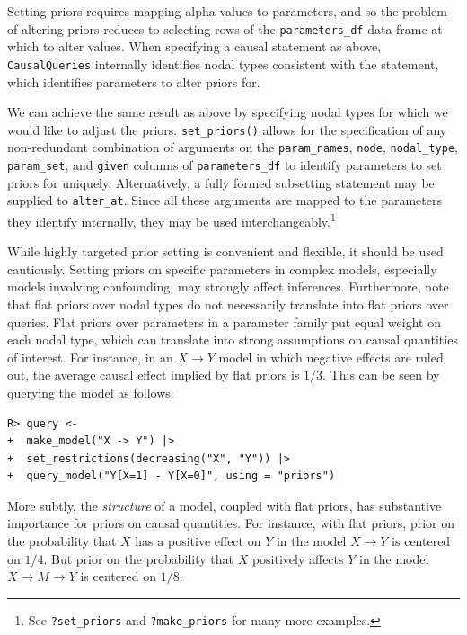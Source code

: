 \documentclass[
  11pt,
  article]{jss}
\begin{document}
Setting priors requires mapping alpha values to parameters, and so the
problem of altering priors reduces to selecting rows of the
\texttt{parameters\_df} data frame at which to alter values. When
specifying a causal statement as above, \texttt{CausalQueries}
internally identifies nodal types consistent with the statement, which
identifies parameters to alter priors for.

We can achieve the same result as above by specifying nodal types for
which we would like to adjust the priors. \texttt{set\_priors()} allows
for the specification of any non-redundant combination of arguments on
the \texttt{param\_names}, \texttt{node}, \texttt{nodal\_type},
\texttt{param\_set}, and \texttt{given} columns of
\texttt{parameters\_df} to identify parameters to set priors for
uniquely. Alternatively, a fully formed subsetting statement may be
supplied to \texttt{alter\_at}. Since all these arguments are mapped to
the parameters they identify internally, they may be used
interchangeably.\footnote{See \texttt{?set\_priors} and
  \texttt{?make\_priors} for many more examples.}

While highly targeted prior setting is convenient and flexible, it
should be used cautiously. Setting priors on specific parameters in
complex models, especially models involving confounding, may strongly
affect inferences. Furthermore, note that flat priors over nodal types
do not necessarily translate into flat priors over queries. Flat priors
over parameters in a parameter family put equal weight on each nodal
type, which can translate into strong assumptions on causal quantities
of interest. For instance, in an \(X \rightarrow Y\) model in which
negative effects are ruled out, the average causal effect implied by
flat priors is \(1/3\). This can be seen by querying the model as
follows:

\begin{verbatim}
R> query <- 
+  make_model("X -> Y") |>
+  set_restrictions(decreasing("X", "Y")) |>
+  query_model("Y[X=1] - Y[X=0]", using = "priors")
\end{verbatim}

More subtly, the \emph{structure} of a model, coupled with flat priors,
has substantive importance for priors on causal quantities. For
instance, with flat priors, prior on the probability that \(X\) has a
positive effect on \(Y\) in the model \(X \rightarrow Y\) is centered on
\(1/4\). But prior on the probability that \(X\) positively affects
\(Y\) in the model \(X \rightarrow M \rightarrow Y\) is centered on
\(1/8\).
\end{document}
